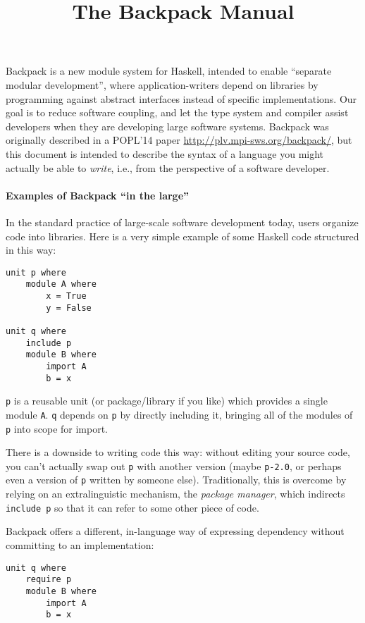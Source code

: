 \documentclass{article}
\title{The Backpack Manual}
\begin{document}
\maketitle

Backpack is a new module system for Haskell, intended to enable
``separate modular development'', where application-writers depend on
libraries by programming against abstract interfaces instead of specific
implementations.  Our goal is to reduce software coupling, and let the
type system and compiler assist developers when they are developing
large software systems.  Backpack was originally described in a POPL'14
paper \url{http://plv.mpi-sws.org/backpack/}, but this document is
intended to describe the syntax of a language you might actually be able
to \emph{write}, i.e., from the perspective of a software developer.

\paragraph{Examples of Backpack ``in the large''}
In the standard practice of large-scale software development today,
users organize code into libraries.  Here is a very simple example of
some Haskell code structured in this way:

\begin{verbatim}
unit p where
    module A where
        x = True
        y = False

unit q where
    include p
    module B where
        import A
        b = x
\end{verbatim}

\verb|p| is a reusable unit (or package/library if you like) which
provides a single module \verb|A|.  \verb|q| depends on \verb|p| by
directly including it, bringing all of the modules of \verb|p| into scope for
import.

There is a downside to writing code this way: without editing your
source code, you can't actually swap out \verb|p| with another version
(maybe \verb|p-2.0|, or perhaps even a version of \verb|p| written by someone else).
Traditionally, this is overcome by relying on an extralinguistic mechanism,
the \emph{package manager}, which indirects \verb|include p| so that
it can refer to some other piece of code.

Backpack offers a different, in-language way of expressing dependency
without committing to an implementation:

\begin{verbatim}
unit q where
    require p
    module B where
        import A
        b = x
\end{verbatim}
\end{document}
